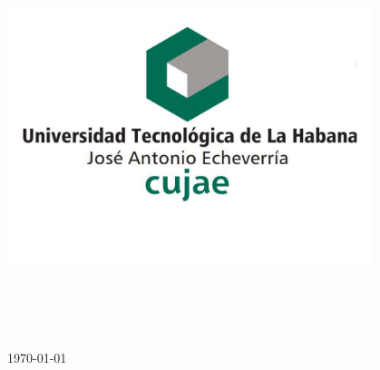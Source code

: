 \begin{titlepage}
    \begin{addmargin}[0cm]{0cm}
        \begin{center}
            \includegraphics[width=0.8\textwidth]{Figure/logo-cujae-centro}\\

            \LARGE{\textbf{\myArea}}\\

            \Large{\textbf{\myDegree}} \\

            \vspace{1.0cm}

            \Large{\myTitle} \\

            \vspace{0.5cm}

            \ifdefined\mySubtitle{\Large{\mySubtitle}\\}\fi

            \vspace{1.0cm}

            \ifdefined\myAuthorNameOne{\Large{\myAuthorNameOne}\\}\fi
            \ifdefined\myAuthorURLOne{\Large{\myAuthorURLOne}\\}\fi

            \ifdefined\myAuthorNameTwo{\Large{\myAuthorNameTwo}\\}\fi
            \ifdefined\myAuthorURLTwo{\Large{\myAuthorURLTwo}\\}\fi

            \vspace{1.0cm}

            \large{\today}\\

            \large{\myLocation}

        \end{center}
    \end{addmargin}
\end{titlepage}
